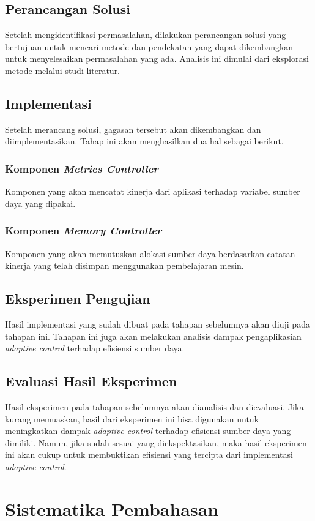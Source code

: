 \subsection{Perancangan Solusi}
Setelah mengidentifikasi permasalahan, dilakukan perancangan solusi yang bertujuan untuk mencari metode dan pendekatan yang dapat dikembangkan untuk menyelesaikan permasalahan yang ada. Analisis ini dimulai dari eksplorasi metode melalui studi literatur.
\subsection{Implementasi}
Setelah merancang solusi, gagasan tersebut akan dikembangkan dan diimplementasikan. Tahap ini akan menghasilkan dua hal sebagai berikut.
\subsubsection{Komponen \textit{Metrics Controller}}
Komponen yang akan mencatat kinerja dari aplikasi terhadap variabel sumber daya yang dipakai.
\subsubsection{Komponen \textit{Memory Controller}}
Komponen yang akan memutuskan alokasi sumber daya berdasarkan catatan kinerja yang telah disimpan menggunakan pembelajaran mesin.
\subsection{Eksperimen Pengujian}
Hasil implementasi yang sudah dibuat pada tahapan sebelumnya akan diuji pada tahapan ini. Tahapan ini juga akan melakukan analisis dampak pengaplikasian \textit{adaptive control} terhadap efisiensi sumber daya.
\subsection{Evaluasi Hasil Eksperimen}
Hasil eksperimen pada tahapan sebelumnya akan dianalisis dan dievaluasi. Jika kurang memuaskan, hasil dari eksperimen ini bisa digunakan untuk meningkatkan dampak \textit{adaptive control} terhadap efisiensi sumber daya yang dimiliki. Namun, jika sudah sesuai yang diekspektasikan, maka hasil eksperimen ini akan cukup untuk membuktikan efisiensi yang tercipta dari implementasi \textit{adaptive control}.

\section{Sistematika Pembahasan}

